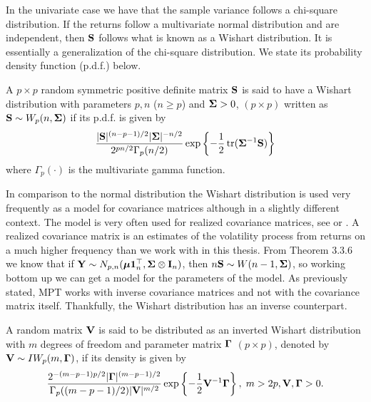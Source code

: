 \documentclass[oneside]{book}\usepackage{knitr}
\begin{document}
In the univariate case we have that the sample variance follows a chi-square distribution. 
If the returns follow a multivariate normal distribution and are independent, then $\mathbf{S}$ follows what is known as a Wishart distribution. 
It is essentially a generalization of the chi-square distribution. 
We state its probability density function (p.d.f.) below.
\begin{definition}\label{def:wishart}
	A $p\times p$ random symmetric positive definite matrix $\mathbf{S}$ is said to have a Wishart distribution with parameters $p, n$ ($n\geq p$) and $\mathbf{\Sigma} > 0$, $(p \times p)$ written as $\mathbf{S} \sim W_p(n, \mathbf{\Sigma})$ if its p.d.f. is given by
	\begin{equation}\label{eqn:wishart_density}
  	\frac{|\mathbf{S}|^{(n-p-1)/2} |\mathbf{\Sigma}|^{- n/2} }{2^{pn/2} \Gamma_p (n/2) } \exp\left\{-\frac{1}{2} \operatorname{tr}(\mathbf{\Sigma}^{-1}\mathbf{S})  \right\}
	\end{equation}
	where $ \Gamma_p (\cdot) $ is the multivariate gamma function.
\end{definition}
In comparison to the normal distribution the Wishart distribution is used very frequently as a model for covariance matrices although in a slightly different context.
The model is very often used for realized covariance matrices, see \citet{barndorff2004econometric} or \citet{alfelt2021modeling}.
A realized covariance matrix is an estimates of the volatility process from returns on a much higher frequency than we work with in this thesis.
From Theorem 3.3.6 we know that if $\mathbf{Y} \sim N_{p,n}(\mbox{\boldmath$\mu$} \mathbf{1}_n^\top, \mathbf{\Sigma} \otimes \mathbf{I}_n)$, then $n\mathbf{S} \sim W(n-1, \mathbf{\Sigma})$, so working bottom up we can get a model for the parameters of the model.
As previously stated, MPT works with inverse covariance matrices and not with the covariance matrix itself. 
Thankfully, the Wishart distribution has an inverse counterpart.
\begin{definition}\label{def:inverse_wishart}
	A random matrix $\mathbf{V}$ is said to be distributed as an inverted Wishart distribution with $m$ degrees of freedom and parameter matrix $\boldsymbol{\Gamma}$ $(p \times p)$, denoted by $\mathbf{V} \sim IW_p(m, \boldsymbol{\Gamma})$, if its density is given by
	\begin{equation}\label{eqn:inverse_wishart}
	\frac{2^{-(m-p-1)p/2} |\boldsymbol{\Gamma}|^{(m-p-1)/2} }{\Gamma_p ((m-p-1)/2) |\mathbf{V}|^{m/2}} \exp\left\{ -\frac{1}{2} \mathbf{V}^{-1} \boldsymbol{\Gamma} \right\}, \; m > 2p, \mathbf{V}, \boldsymbol{\Gamma} > 0.
	\end{equation}
\end{definition}
\end{document}
